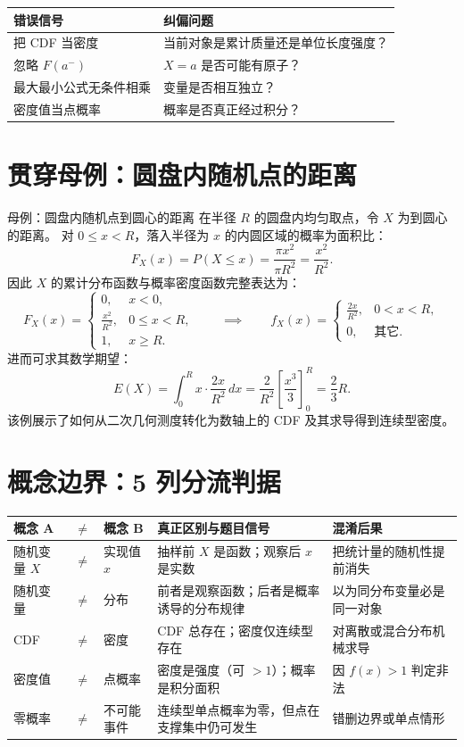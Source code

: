 \documentclass[11pt,a4paper]{ctexart}
\begin{document}
\begin{center}
\begin{tabularx}{\linewidth}{L{4.0cm}Y}
\toprule 错误信号 & 纠偏问题 \\
\midrule
把 CDF 当密度 & 当前对象是累计质量还是单位长度强度？ \\
忽略 $F(a^-)$ & $X=a$ 是否可能有原子？ \\
最大最小公式无条件相乘 & 变量是否相互独立？ \\
密度值当点概率 & 概率是否真正经过积分？ \\
\bottomrule
\end{tabularx}
\end{center}

\section{贯穿母例：圆盘内随机点的距离}

\begin{examplebox}{母例：圆盘内随机点到圆心的距离}
在半径 $R$ 的圆盘内均匀取点，令 $X$ 为到圆心的距离。
对 $0\le x < R$，落入半径为 $x$ 的内圆区域的概率为面积比：
\[
F_X(x) = P(X \le x) = \frac{\pi x^2}{\pi R^2} = \frac{x^2}{R^2}.
\]
因此 $X$ 的累计分布函数与概率密度函数完整表达为：
\[
F_X(x) = \begin{cases}
0, & x < 0, \\
\frac{x^2}{R^2}, & 0 \le x < R, \\
1, & x \ge R.
\end{cases}
\qquad \implies \qquad
f_X(x) = \begin{cases}
\frac{2x}{R^2}, & 0 < x < R, \\
0, & \text{其它}.
\end{cases}
\]
进而可求其数学期望：
\[
E(X) = \int_0^R x \cdot \frac{2x}{R^2} \, dx = \frac{2}{R^2} \left[ \frac{x^3}{3} \right]_0^R = \frac{2}{3} R.
\]
该例展示了如何从二次几何测度转化为数轴上的 CDF 及其求导得到连续型密度。
\end{examplebox}

\section{概念边界：5 列分流判据}

\small
\begin{longtable}{L{2.8cm}L{2.8cm}L{3.4cm}L{3.2cm}L{2.8cm}}
\toprule
\textbf{概念 A} & \textbf{$\ne$} & \textbf{概念 B} & \textbf{真正区别与题目信号} & \textbf{混淆后果}\\
\midrule
随机变量 $X$ & $\ne$ & 实现值 $x$ & 抽样前 $X$ 是函数；观察后 $x$ 是实数 & 把统计量的随机性提前消失\\
随机变量 & $\ne$ & 分布 & 前者是观察函数；后者是概率诱导的分布规律 & 以为同分布变量必是同一对象\\
CDF & $\ne$ & 密度 & CDF 总存在；密度仅连续型存在 & 对离散或混合分布机械求导\\
密度值 & $\ne$ & 点概率 & 密度是强度（可 $>1$）；概率是积分面积 & 因 $f(x)>1$ 判定非法\\
零概率 & $\ne$ & 不可能事件 & 连续型单点概率为零，但点在支撑集中仍可发生 & 错删边界或单点情形\\
\bottomrule
\end{longtable}
\normalsize
\end{document}
